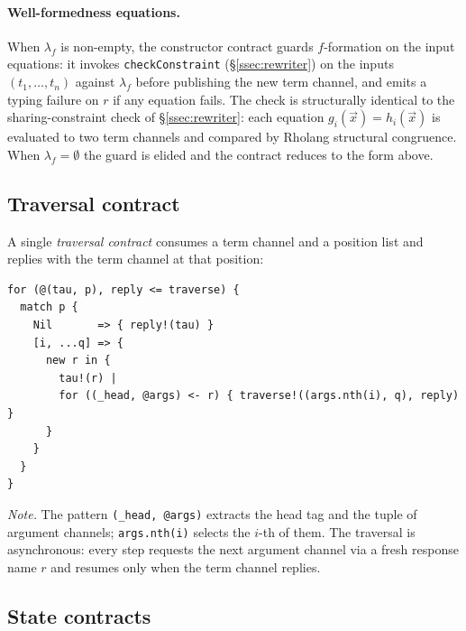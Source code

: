\documentclass[11pt]{article}
\theoremstyle{plain}
\theoremstyle{definition}
\theoremstyle{remark}
\begin{document}
\paragraph{Well-formedness equations.}
When $\lambda_f$ is non-empty, the constructor contract guards
$f$-formation on the input equations: it invokes
\texttt{checkConstraint} (\S\ref{ssec:rewriter}) on the inputs
$(t_1, \ldots, t_n)$ against $\lambda_f$ before publishing the new
term channel, and emits a typing failure on $r$ if any equation fails.
The check is structurally identical to the sharing-constraint check
of \S\ref{ssec:rewriter}: each equation $g_i(\vec{x}) = h_i(\vec{x})$
is evaluated to two term channels and compared by Rholang structural
congruence. When $\lambda_f = \emptyset$ the guard is elided and the
contract reduces to the form above.

\subsection{Traversal contract}\label{ssec:emit-traversal}

A single \emph{traversal contract} consumes a term channel and a position
list and replies with the term channel at that position:
\begin{lstlisting}
for (@(tau, p), reply <= traverse) {
  match p {
    Nil       => { reply!(tau) }
    [i, ...q] => {
      new r in {
        tau!(r) |
        for ((_head, @args) <- r) { traverse!((args.nth(i), q), reply) }
      }
    }
  }
}
\end{lstlisting}
\emph{Note.} The pattern \lstinline|(_head, @args)| extracts the head tag
and the tuple of argument channels; \lstinline|args.nth(i)| selects the
$i$-th of them. The traversal is asynchronous: every step requests the
next argument channel via a fresh response name $r$ and resumes only
when the term channel replies.

\subsection{State contracts}\label{ssec:emit-states}
\end{document}
